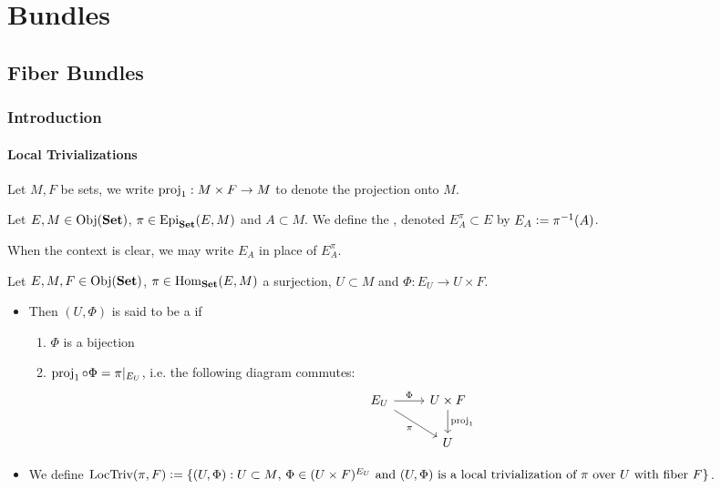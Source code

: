 \documentclass{book}
\begin{document}
	\newpage
	\part{Bundles}
	
	\chapter{Fiber Bundles}
	
	\section{Introduction}
	
	\subsection{Local Trivializations}
	
	\begin{note} 
		Let $M, F$ be sets, we write $\operatorname{\text{proj}}_1: M \times F \rightarrow M$ to denote the projection onto $M$.
	\end{note}
	
	\begin{defn} 
		Let $E, M \in \operatorname{Obj}(\text{\textbf{Set}})$, $\pi \in \operatorname{Epi}_{\text{\textbf{Set}}}(E, M)$ and $A \subset M$. We define the , denoted $E_A^{\pi} \subset E$ by $E_A \vcentcolon= \pi^{-1}(A)$. 
	\end{defn}
	
	\begin{note}
		When the context is clear, we may write $E_A$ in place of $E_A^{\pi}$.
	\end{note}

	\begin{defn} 
		Let $E, M, F \in \operatorname{Obj}(\text{\textbf{Set}})$, $\pi \in \operatorname{Hom}_{\text{\textbf{Set}}}(E, M)$ a surjection, $U \subset M$ and $\Phi: E_U \rightarrow U \times F$. 
		\begin{itemize}
			\item Then $(U, \Phi)$ is said to be a   if 
			\begin{enumerate}
				\item $\Phi$ is a bijection
				\item $\operatorname{\text{proj}}_1 \circ \Phi = \pi|_{E_U}$, i.e. the following diagram commutes:
				\[ 
				\begin{tikzcd}
					E_U \arrow[r, "\Phi"] \arrow[dr, "\pi"'] & U \times F \arrow[d, "\prj_1"]  \\
					& U
				\end{tikzcd}
				\]
			\end{enumerate}
			\item We define $\text{LocTriv}(\pi, F) \vcentcolon= \{(U, \Phi): \text{$U \subset M$, $\Phi \in (U \times F)^{E_U}$ and $(U, \Phi)$ is a local trivialization of $\pi$ over $U$ with fiber $F$}\}$.
		\end{itemize}
	\end{defn}
	
\end{document}

